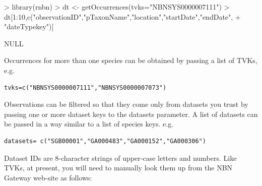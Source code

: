 \documentclass{article}
\begin{document}
\begin{Schunk}
\begin{Sinput}
> library(rnbn)
> dt <- getOccurrences(tvks="NBNSYS0000007111")
> dt[1:10,c("observationID","pTaxonName","location","startDate","endDate",
+           "dateTypekey")]
\end{Sinput}
\begin{Soutput}
NULL
\end{Soutput}
\end{Schunk}

Occurrences for more than one species can be obtained by  passing a list of
TVKs, e.g. 
\begin{verbatim}
tvks=c("NBNSYS0000007111","NBNSYS0000007073")
\end{verbatim}

Observations can be filtered so that they come only from datasets you trust
by passing one or more dataset keys to the datasets parameter. A list
of datasets can be passed in a way similar to a list of species keys. e.g.
\begin{verbatim}
datasets= c("SGB00001","GA000483","GA000152","GA000306")
\end{verbatim}

Dataset IDs are 8-character strings of upper-case letters and numbers. Like
TVKs, at present, you will need to manually look them up from the NBN Gateway 
web-site as follows:
\end{document}
